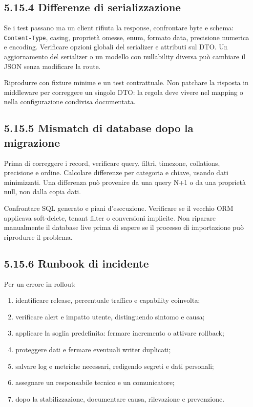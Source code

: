 \documentclass[
  italian,
  10pt,
]{book}
\providecommand{\tightlist}{%
  \setlength{\itemsep}{0pt}\setlength{\parskip}{0pt}}
\begin{document}
\subsection{5.15.4 Differenze di
serializzazione}\label{differenze-di-serializzazione}

Se i test passano ma un client rifiuta la response, confrontare byte e
schema: \texttt{Content-Type}, casing, proprietà omesse, enum, formato
data, precisione numerica e encoding. Verificare opzioni globali del
serializer e attributi sul DTO. Un aggiornamento del serializer o un
modello con nullability diversa può cambiare il JSON senza modificare la
route.

Riprodurre con fixture minime e un test contrattuale. Non patchare la
risposta in middleware per correggere un singolo DTO: la regola deve
vivere nel mapping o nella configurazione condivisa documentata.

\subsection{5.15.5 Mismatch di database dopo la
migrazione}\label{mismatch-di-database-dopo-la-migrazione}

Prima di correggere i record, verificare query, filtri, timezone,
collations, precisione e ordine. Calcolare differenze per categoria e
chiave, usando dati minimizzati. Una differenza può provenire da una
query N+1 o da una proprietà null, non dalla copia dati.

Confrontare SQL generato e piani d'esecuzione. Verificare se il vecchio
ORM applicava soft-delete, tenant filter o conversioni implicite. Non
riparare manualmente il database live prima di sapere se il processo di
importazione può riprodurre il problema.

\subsection{5.15.6 Runbook di incidente}\label{runbook-di-incidente}

Per un errore in rollout:

\begin{enumerate}
\def\labelenumi{\arabic{enumi}.}
\tightlist
\item
  identificare release, percentuale traffico e capability coinvolta;
\item
  verificare alert e impatto utente, distinguendo sintomo e causa;
\item
  applicare la soglia predefinita: fermare incremento o attivare
  rollback;
\item
  proteggere dati e fermare eventuali writer duplicati;
\item
  salvare log e metriche necessari, redigendo segreti e dati personali;
\item
  assegnare un responsabile tecnico e un comunicatore;
\item
  dopo la stabilizzazione, documentare causa, rilevazione e prevenzione.
\end{enumerate}
\end{document}
